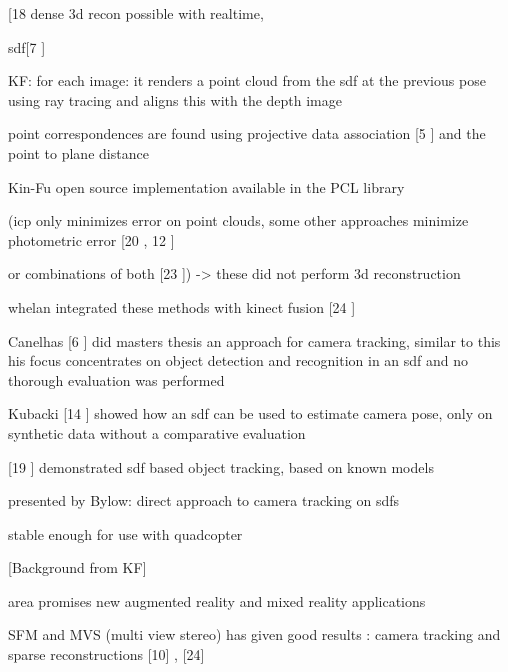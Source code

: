 [18 \cite{Newcombe11Kinectfusion} dense 3d recon possible with realtime, 

sdf[7 \cite{Curless96Volumetric}]

KF: for each image:
it renders a point cloud from the sdf at the previous pose using ray tracing and aligns this with the depth image


point correspondences are found using projective data association [5 \cite{Blais95Registering}] and the point to plane distance

Kin-Fu open source implementation available in the PCL library

(icp only minimizes error on point clouds, some other approaches minimize photometric error [20 \cite{Steinbrucker11Real}, 12 \cite{Kerl13Robust}]

or combinations of both [23 \cite{Tykkala11Direct}]) -> these did not perform 3d reconstruction

whelan integrated these methods with kinect fusion [24 \cite{Whelan13Robust}]

Canelhas [6 \cite{Canelhas12Scene}] did masters thesis an approach for camera tracking, similar to this
his focus concentrates on object detection and recognition in an sdf and no thorough evaluation was performed

Kubacki [14 \cite{Kubacki12Registration}] showed how an sdf can be used to estimate camera pose, only on synthetic data without a comparative evaluation

[19 \cite{Ren12Unified}] demonstrated sdf based object tracking, based on known models

presented by Bylow: direct approach to camera tracking on sdfs


stable enough for use with quadcopter























[Background from KF]

area promises new augmented reality and mixed reality applications

SFM and MVS (multi view stereo) has given good results : camera tracking  and sparse reconstructions [10] \cite{Fitzgibbon98Automatic}, \cite{Seitz06Comparison} [24] 

